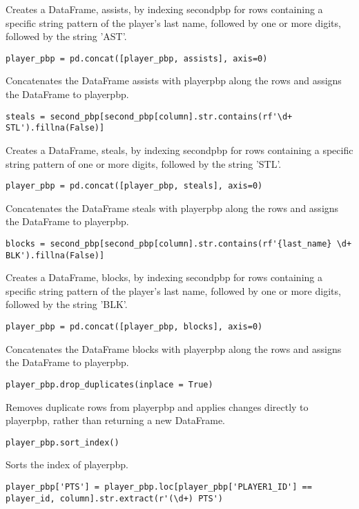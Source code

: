 \documentclass{article}
\begin{document}
Creates a DataFrame, assists, by indexing second\textunderscore pbp for rows containing a specific string pattern of the player's last name, followed by one or more digits, followed by the string 'AST'.
\begin{lstlisting}
player_pbp = pd.concat([player_pbp, assists], axis=0)
\end{lstlisting}
Concatenates the DataFrame assists with player\textunderscore pbp along the rows and assigns the DataFrame to player\textunderscore pbp.
\begin{lstlisting}
steals = second_pbp[second_pbp[column].str.contains(rf'\d+ STL').fillna(False)]
\end{lstlisting}
Creates a DataFrame, steals, by indexing second\textunderscore pbp for rows containing a specific string pattern of one or more digits, followed by the string 'STL'.
\begin{lstlisting}
player_pbp = pd.concat([player_pbp, steals], axis=0)
\end{lstlisting}
Concatenates the DataFrame steals with player\textunderscore pbp along the rows and assigns the DataFrame to player\textunderscore pbp.
\begin{lstlisting}
blocks = second_pbp[second_pbp[column].str.contains(rf'{last_name} \d+ BLK').fillna(False)]
\end{lstlisting}
Creates a DataFrame, blocks, by indexing second\textunderscore pbp for rows containing a specific string pattern of the player's last name, followed by one or more digits, followed by the string 'BLK'.
\begin{lstlisting}
player_pbp = pd.concat([player_pbp, blocks], axis=0)
\end{lstlisting}
Concatenates the DataFrame blocks with player\textunderscore pbp along the rows and assigns the DataFrame to player\textunderscore pbp.
\begin{lstlisting}
player_pbp.drop_duplicates(inplace = True)
\end{lstlisting}
Removes duplicate rows from player\textunderscore pbp and applies changes directly to player\textunderscore pbp, rather than returning a new DataFrame.
\begin{lstlisting}
player_pbp.sort_index()
\end{lstlisting}
Sorts the index of player\textunderscore pbp.
\begin{lstlisting}
player_pbp['PTS'] = player_pbp.loc[player_pbp['PLAYER1_ID'] == player_id, column].str.extract(r'(\d+) PTS')
\end{lstlisting}
\end{document}
